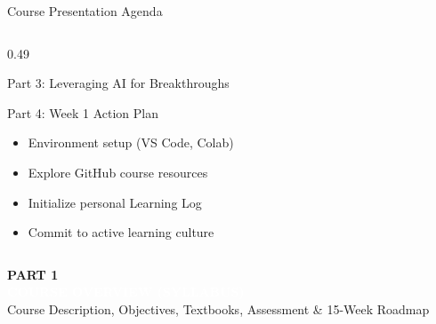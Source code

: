 \documentclass[aspectratio=169, 10pt]{beamer}
\begin{document}
\begin{frame}{Course Presentation Agenda}
\begin{columns}[T]
\begin{column}{0.49\textwidth}
\begin{cbox}[accentorange]{Part 3: Leveraging AI for Breakthroughs}
\begin{itemize}
        \end{itemize}
      \end{cbox}
      \vspace{0.1cm}
      \begin{cbox}[darkgray]{Part 4: Week 1 Action Plan}
        \footnotesize
        \begin{itemize}\setlength{\itemsep}{1pt}
          \item Environment setup (VS Code, Colab)
          \item Explore GitHub course resources
          \item Initialize personal Learning Log
          \item Commit to active learning culture
        \end{itemize}
      \end{cbox}
    \end{column}
  \end{columns}
\end{frame}

\begin{frame}[plain]
  \vfill
  \begin{tcolorbox}[colback=primaryblue, colframe=primaryblue, arc=5pt, left=15pt, right=15pt, top=15pt, bottom=15pt]
    \textcolor{accentorange}{\large\textbf{PART 1}}\\[4pt]
    {\LARGE\textbf{\textcolor{white}{COURSE OVERVIEW (SYLLABUS)}}}\\[6pt]
    \textcolor{white!80}{\small Course Description, Objectives, Textbooks, Assessment \& 15-Week Roadmap}
  \end{tcolorbox}
  \vfill
\end{frame}
\end{document}
